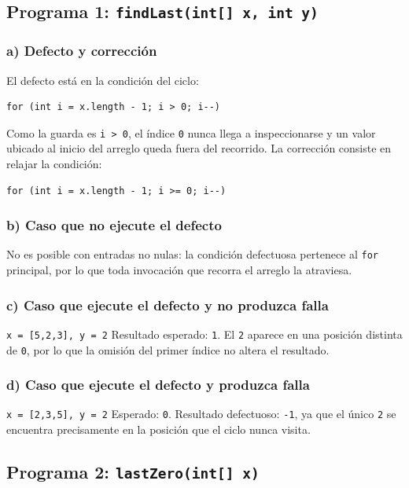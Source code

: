 \documentclass[12pt,a4paper]{article}
\begin{document}
\subsection{Programa 1: \texttt{findLast(int[] x, int y)}}
\subsubsection*{a) Defecto y corrección}
El defecto está en la condición del ciclo:
\begin{lstlisting}[style=javastyle]
for (int i = x.length - 1; i > 0; i--)
\end{lstlisting}
Como la guarda es \texttt{i > 0}, el índice \texttt{0} nunca llega a inspeccionarse y un valor ubicado al inicio del arreglo queda fuera del recorrido. La corrección consiste en relajar la condición:
\begin{lstlisting}[style=javastyle]
for (int i = x.length - 1; i >= 0; i--)
\end{lstlisting}

\subsubsection*{b) Caso que no ejecute el defecto}
No es posible con entradas no nulas: la condición defectuosa pertenece al \texttt{for} principal, por lo que toda invocación que recorra el arreglo la atraviesa.

\subsubsection*{c) Caso que ejecute el defecto y no produzca falla}
\texttt{x = [5,2,3], y = 2} \hspace{0.5cm} Resultado esperado: \texttt{1}. El \texttt{2} aparece en una posición distinta de \texttt{0}, por lo que la omisión del primer índice no altera el resultado.

\subsubsection*{d) Caso que ejecute el defecto y produzca falla}
\texttt{x = [2,3,5], y = 2} \hspace{0.5cm} Esperado: \texttt{0}. Resultado defectuoso: \texttt{-1}, ya que el único \texttt{2} se encuentra precisamente en la posición que el ciclo nunca visita.

\subsection{Programa 2: \texttt{lastZero(int[] x)}}
\end{document}
